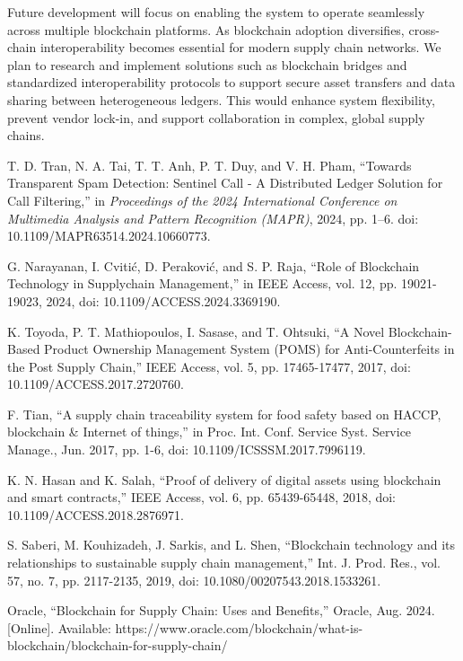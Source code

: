 \documentclass[conference]{IEEEtran}
\begin{document}
Future development will focus on enabling the system to operate seamlessly across multiple blockchain platforms. As blockchain adoption diversifies, cross-chain interoperability becomes essential for modern supply chain networks. We plan to research and implement solutions such as blockchain bridges and standardized interoperability protocols to support secure asset transfers and data sharing between heterogeneous ledgers. This would enhance system flexibility, prevent vendor lock-in, and support collaboration in complex, global supply chains.
\begin{thebibliography}{00}

T. D. Tran, N. A. Tai, T. T. Anh, P. T. Duy, and V. H. Pham, ``Towards Transparent Spam Detection: Sentinel Call - A Distributed Ledger Solution for Call Filtering,'' in \textit{Proceedings of the 2024 International Conference on Multimedia Analysis and Pattern Recognition (MAPR)}, 2024, pp. 1–6. doi: 10.1109/MAPR63514.2024.10660773.

 G. Narayanan, I. Cvitić, D. Peraković, and S. P. Raja, ``Role of Blockchain Technology in Supplychain Management,'' in IEEE Access, vol. 12, pp. 19021-19023, 2024, doi: 10.1109/ACCESS.2024.3369190.

 K. Toyoda, P. T. Mathiopoulos, I. Sasase, and T. Ohtsuki, ``A Novel Blockchain-Based Product Ownership Management System (POMS) for Anti-Counterfeits in the Post Supply Chain,'' IEEE Access, vol. 5, pp. 17465-17477, 2017, doi: 10.1109/ACCESS.2017.2720760.

 F. Tian, ``A supply chain traceability system for food safety based on HACCP, blockchain \& Internet of things,'' in Proc. Int. Conf. Service Syst. Service Manage., Jun. 2017, pp. 1-6, doi: 10.1109/ICSSSM.2017.7996119.

 K. N. Hasan and K. Salah, ``Proof of delivery of digital assets using blockchain and smart contracts,'' IEEE Access, vol. 6, pp. 65439-65448, 2018, doi: 10.1109/ACCESS.2018.2876971.

 S. Saberi, M. Kouhizadeh, J. Sarkis, and L. Shen, ``Blockchain technology and its relationships to sustainable supply chain management,'' Int. J. Prod. Res., vol. 57, no. 7, pp. 2117-2135, 2019, doi: 10.1080/00207543.2018.1533261.

 Oracle, ``Blockchain for Supply Chain: Uses and Benefits,'' Oracle, Aug. 2024. [Online]. Available: https://www.oracle.com/blockchain/what-is-blockchain/blockchain-for-supply-chain/


\end{thebibliography}
\end{document}
